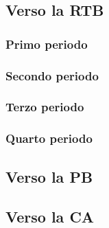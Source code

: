 \subsection{Verso la RTB}
\subsubsection{Primo periodo}
\subsubsection{Secondo periodo}
\subsubsection{Terzo periodo}
\subsubsection{Quarto periodo}

\subsection{Verso la PB}

\subsection{Verso la CA}